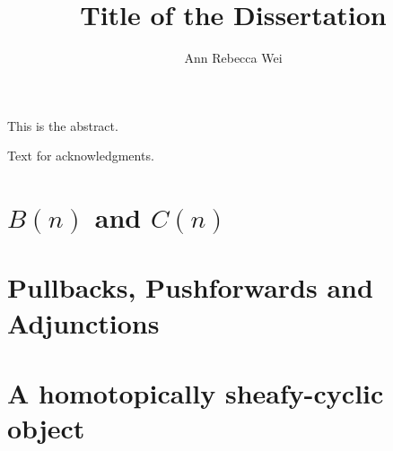 \documentclass[12pt]{nuthesis}
\author{Ann Rebecca Wei}
\title{Title of the Dissertation}
\theoremstyle{definition}
\theoremstyle{remark}
\theoremstyle{example}
\begin{document}

\frontmatter		%
\maketitle		%

\abstract		%
This is the abstract.

\acknowledgements	%
Text for acknowledgments.



%
%
%
\clearpage{} %
\tableofcontents	%





\mainmatter             %
%
\chapter{$B(n)$ and $C(n)$}
	
	
	
%
\chapter{Pullbacks, Pushforwards and Adjunctions}
	
	
	
	
	
	
%
\chapter{A homotopically sheafy-cyclic object}
	
	
	
	
\end{document}
